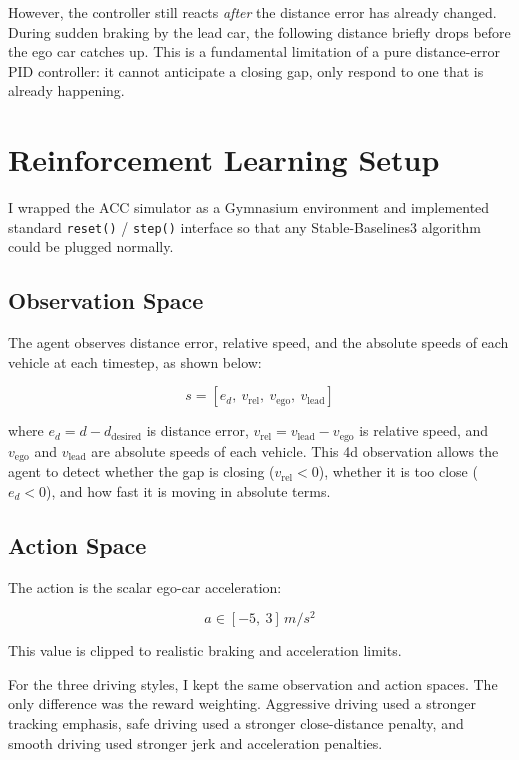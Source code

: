 \documentclass{article}
\begin{document}
However, the controller still reacts \emph{after} the distance error has already changed. During sudden braking by the lead car, the following distance briefly drops before the ego car catches up. This is a fundamental limitation of a pure distance-error PID controller: it cannot anticipate a closing gap, only respond to one that is already happening.

\section{Reinforcement Learning Setup}

I wrapped the ACC simulator as a Gymnasium environment and implemented standard \texttt{reset()} / \texttt{step()} interface so that any Stable-Baselines3 algorithm could be plugged normally.

\subsection*{Observation Space}

The agent observes distance error, relative speed, and the absolute speeds of each vehicle at each timestep, as shown below:

\[
s = [e_d,\ v_{\text{rel}},\ v_{\text{ego}},\ v_{\text{lead}}]
\]

where $e_d = d - d_{\text{desired}}$ is distance error, $v_{\text{rel}} = v_{\text{lead}} - v_{\text{ego}}$ is relative speed, and $v_{\text{ego}}$ and $v_{\text{lead}}$ are absolute speeds of each vehicle. This 4d observation allows the agent to detect whether the gap is closing ($v_{\text{rel}} < 0$), whether it is too close ($e_d < 0$), and how fast it is moving in absolute terms.

\subsection*{Action Space}

The action is the scalar ego-car acceleration:

\[
a \in [-5,\ 3]\,\si{m/s^2}
\]

This value is clipped to realistic braking and acceleration limits.

For the three driving styles, I kept the same observation and action spaces. The only difference was the reward weighting. Aggressive driving used a stronger tracking emphasis, safe driving used a stronger close-distance penalty, and smooth driving used stronger jerk and acceleration penalties.
\end{document}
